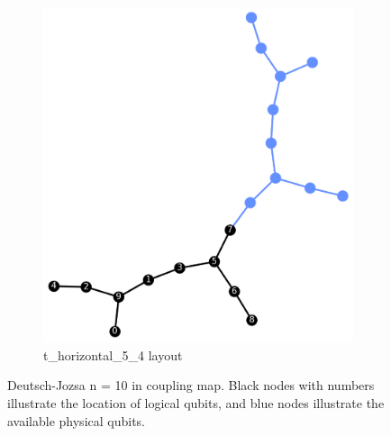 \begin{figure}[!htb]
\begin{subfigure}{0.25\linewidth}
        \includegraphics[width=\linewidth]{image/dj_10_t_vertical_5_4.png}
        \caption{t\_horizontal\_5\_4 layout}
        \label{fig:dj_10_t_vertical_5_4}
    \end{subfigure}
    \caption{Deutsch-Jozsa n = 10 in coupling map. Black nodes with numbers illustrate the location of logical qubits, and blue nodes illustrate the available physical qubits.}
    \label{fig:dj-10-layout}
\end{figure}